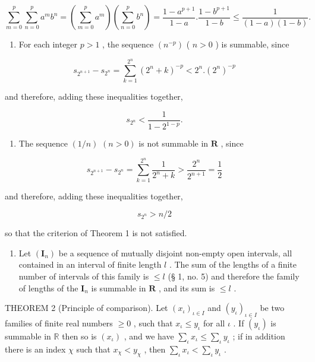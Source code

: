 \[
\sum_ {m = 0} ^ {p} \sum_ {n = 0} ^ {p} a ^ {m} b ^ {n} = \left(\sum_ {m = 0} ^ {p} a ^ {m}\right) \left(\sum_ {n = 0} ^ {p} b ^ {n}\right) = \frac {1 - a ^ {p + 1}}{1 - a}. \frac {1 - b ^ {p + 1}}{1 - b} \leqslant \frac {1}{(1 - a) (1 - b)}.
\]

\begin{enumerate}
\def\labelenumi{\arabic{enumi})}
\setcounter{enumi}{2}
\tightlist
\item
  For each integer \(p > 1\) , the sequence \((n^{-p})\) ( \(n > 0\) ) is summable, since
\end{enumerate}

\[
s _ {2 ^ {n + 1}} - s _ {2 ^ {n}} = \sum_ {k = 1} ^ {2 ^ {n}} (2 ^ {n} + k) ^ {- p} <   2 ^ {n}. (2 ^ {n}) ^ {- p}
\]

and therefore, adding these inequalities together,

\[
s _ {2 ^ {n}} <   \frac {1}{1 - 2 ^ {1 - p}}.
\]

\begin{enumerate}
\def\labelenumi{\arabic{enumi})}
\setcounter{enumi}{3}
\tightlist
\item
The sequence \((1 / n)\) \((n > 0)\) is not summable in \(\mathbf{R}\) , since
\end{enumerate}

\[
s _ {2 ^ {n + 1}} - s _ {2 ^ {n}} = \sum_ {k = 1} ^ {2 ^ {n}} \frac {1}{2 ^ {n} + k} > \frac {2 ^ {n}}{2 ^ {n + 1}} = \frac {1}{2}
\]

and therefore, adding these inequalities together,

\[
s _ {2 ^ {n}} > n / 2
\]

so that the criterion of Theorem 1 is not satisfied.

\begin{enumerate}
\def\labelenumi{\arabic{enumi})}
\setcounter{enumi}{4}
\tightlist
\item
  Let \((\mathbf{I}_n)\) be a sequence of mutually disjoint non-empty open intervals, all contained in an interval of finite length \(l\) . The sum of the lengths of a finite number of intervals of this family is \(\leqslant l\) (§ 1, no. 5) and therefore the family of lengths of the \(\mathbf{I}_n\) is summable in \(\mathbf{R}\) , and its sum is \(\leqslant l\) .
\end{enumerate}

THEOREM 2 (Principle of comparison). Let \((x_{\iota})_{\iota\in I}\) and \((y_{\iota})_{\iota\in I}\) be two families of finite real numbers \(\geqslant 0\) , such that \(x_{\iota}\leqslant y_{\iota}\) for all \(\iota\) . If \((y_{\iota})\) is summable in \(\mathbb{R}\) then so is \((x_{\iota})\) , and we have \(\sum_{\iota}x_{\iota}\leqslant\sum_{\iota}y_{\iota}\) ; if in addition there is an index \(\chi\) such that \(x_{\chi}<y_{\chi}\) , then \(\sum_{\iota}x_{\iota}<\sum_{\iota}y_{\iota}\) .

